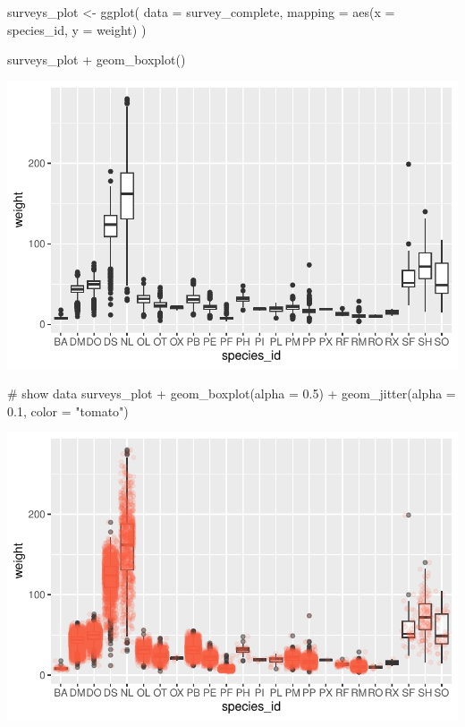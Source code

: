 \documentclass[
  letterpaper,
  DIV=11,
  numbers=noendperiod]{scrreprt}
\newenvironment{Shaded}{\begin{snugshade}}{\end{snugshade}}
\newcommand{\AttributeTok}[1]{\textcolor[rgb]{0.40,0.45,0.13}{#1}}
\newcommand{\CommentTok}[1]{\textcolor[rgb]{0.37,0.37,0.37}{#1}}
\newcommand{\FloatTok}[1]{\textcolor[rgb]{0.68,0.00,0.00}{#1}}
\newcommand{\FunctionTok}[1]{\textcolor[rgb]{0.28,0.35,0.67}{#1}}
\newcommand{\NormalTok}[1]{\textcolor[rgb]{0.00,0.23,0.31}{#1}}
\newcommand{\OtherTok}[1]{\textcolor[rgb]{0.00,0.23,0.31}{#1}}
\newcommand{\SpecialCharTok}[1]{\textcolor[rgb]{0.37,0.37,0.37}{#1}}
\newcommand{\StringTok}[1]{\textcolor[rgb]{0.13,0.47,0.30}{#1}}
\begin{document}
\begin{Shaded}
\begin{Highlighting}[]
\NormalTok{surveys\_plot }\OtherTok{\textless{}{-}} \FunctionTok{ggplot}\NormalTok{(}
  \AttributeTok{data =}\NormalTok{ survey\_complete,}
  \AttributeTok{mapping =} \FunctionTok{aes}\NormalTok{(}\AttributeTok{x =}\NormalTok{ species\_id, }\AttributeTok{y =}\NormalTok{ weight)}
\NormalTok{)}

\NormalTok{surveys\_plot }\SpecialCharTok{+} \FunctionTok{geom\_boxplot}\NormalTok{()}
\end{Highlighting}
\end{Shaded}

\includegraphics{src/notebooks/r_files/figure-pdf/unnamed-chunk-50-1.pdf}

\begin{Shaded}
\begin{Highlighting}[]
\CommentTok{\# show data}
\NormalTok{surveys\_plot }\SpecialCharTok{+} \FunctionTok{geom\_boxplot}\NormalTok{(}\AttributeTok{alpha =} \FloatTok{0.5}\NormalTok{) }\SpecialCharTok{+}
  \FunctionTok{geom\_jitter}\NormalTok{(}\AttributeTok{alpha =} \FloatTok{0.1}\NormalTok{, }\AttributeTok{color =} \StringTok{"tomato"}\NormalTok{)}
\end{Highlighting}
\end{Shaded}

\includegraphics{src/notebooks/r_files/figure-pdf/unnamed-chunk-50-2.pdf}
\end{document}
